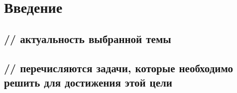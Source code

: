 \chapter{Введение}

\section{// актуальность выбранной темы}
\section{// перечисляются задачи, которые необходимо решить для достижения этой цели}
